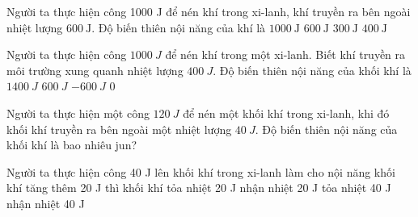 \begin{ex}
	Người ta thực hiện công 1000 J để nén khí trong xi-lanh, khí truyền ra bên ngoài nhiệt lượng \(600 \ \text{J}\). Độ biến thiên nội năng của khí là
	\choice
	{$1000 \ \text{J}$}
	{$600 \ \text{J}$}
	{$300 \ \text{J}$}
	{\True $400 \ \text{J}$}
\end{ex}


\begin{ex}
	Người ta thực hiện công $1000 \ J$ để nén khí trong một xi-lanh. Biết khí truyền ra môi trường xung quanh nhiệt lượng $400 \ J$. Độ biến thiên nội năng của khối khí là
	\choice
	{$1400 \ J$}
	{\True $600 \ J$}
	{$-600 \ J$}
	{0}
	\end{ex}
	
\begin{ex} 
	Người ta thực hiện một công $120 \ J$ để nén một khối khí trong xi-lanh, khi đó khối khí truyền ra bên ngoài một nhiệt lượng $40 \ J$. Độ biến thiên nội năng của khối khí là bao nhiêu jun?
\end{ex}


\begin{ex}%
	Người ta thực hiện công 40 J lên khối khí trong xi-lanh làm cho nội năng khối khí tăng thêm 20 J thì khối khí
	\choice
	{\True tỏa nhiệt 20 J}
	{nhận nhiệt 20 J}
	{tỏa nhiệt 40 J}
	{nhận nhiệt 40 J}
	\end{ex}




